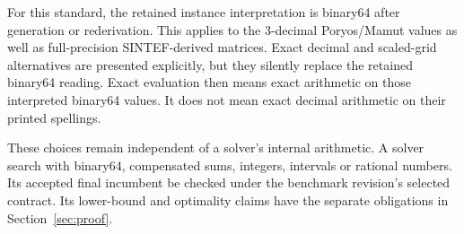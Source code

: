 For this standard, the retained instance interpretation is binary64 after generation or rederivation. This applies to the 3-decimal Poryos/Mamut values as well as full-precision SINTEF-derived matrices. Exact decimal and scaled-grid alternatives are presented explicitly, but they \mustnot{} silently replace the retained binary64 reading. Exact evaluation then means exact arithmetic on those interpreted binary64 values. It does not mean exact decimal arithmetic on their printed spellings.

These choices remain independent of a solver's internal arithmetic. A solver \may{} search with binary64, compensated sums, integers, intervals or rational numbers. Its accepted final incumbent \must{} be checked under the benchmark revision's selected contract. Its lower-bound and optimality claims have the separate obligations in Section~\ref{sec:proof}.
